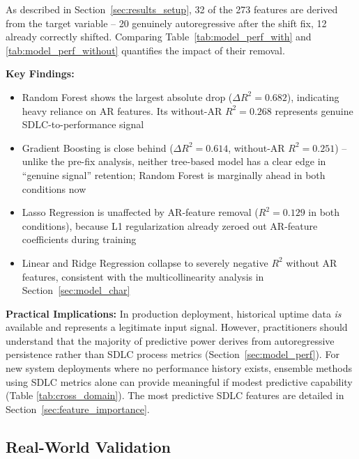 \documentclass[technologies,article,submit,pdftex,moreauthors]{Definitions/mdpi}
\begin{document}
As described in Section~\ref{sec:results_setup}, 32 of the 273 features are derived from the
target variable -- 20 genuinely autoregressive after the shift fix, 12
already correctly shifted. Comparing Table~\ref{tab:model_perf_with}
and \ref{tab:model_perf_without} quantifies the impact of their
removal.

\textbf{Key Findings:}

\begin{itemize}
\item
  Random Forest shows the largest absolute drop
  (\(\Delta R^2 = 0.682\)), indicating heavy reliance on AR features.
  Its without-AR \(R^2 = 0.268\) represents genuine SDLC-to-performance
  signal
\item
  Gradient Boosting is close behind (\(\Delta R^2 = 0.614\), without-AR
  \(R^2 = 0.251\)) -- unlike the pre-fix analysis, neither tree-based
  model has a clear edge in ``genuine signal'' retention; Random Forest
  is marginally ahead in both conditions now
\item
  Lasso Regression is unaffected by AR-feature removal (\(R^2 = 0.129\)
  in both conditions), because L1 regularization already zeroed out
  AR-feature coefficients during training
\item
  Linear and Ridge Regression collapse to severely negative \(R^2\)
  without AR features, consistent with the multicollinearity analysis in
  Section~\ref{sec:model_char}
\end{itemize}

\textbf{Practical Implications:} In production deployment, historical
uptime data \emph{is} available and represents a legitimate input
signal. However, practitioners should understand that the majority of
predictive power derives from autoregressive persistence rather than
SDLC process metrics (Section~\ref{sec:model_perf}). For new system deployments where no
performance history exists, ensemble methods using SDLC metrics alone
can provide meaningful if modest predictive capability (Table
\ref{tab:cross_domain}). The most predictive SDLC features are detailed
in Section~\ref{sec:feature_importance}.

\subsection{Real-World Validation}\label{sec:real_world_results}
\end{document}
